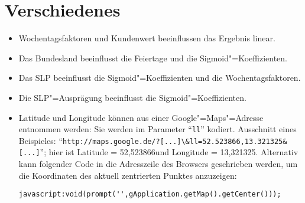 \chapter{Verschiedenes}\label{chap:remarks}

\begin{itemize}
\item Wochentagsfaktoren und Kundenwert beeinflussen das Ergebnis linear.
\item Das Bundesland beeinflusst die Feiertage und die Sigmoid"=Koeffizienten.
\item Das SLP beeinflusst die Sigmoid"=Koeffizienten und die Wochentagsfaktoren.
\item Die SLP"=Ausprägung beeinflusst die Sigmoid"=Koeffizienten.
\item Latitude und Longitude können aus einer Google"=Maps"=Adresse entnommen werden: Sie werden im Parameter "`\verb|ll|"' kodiert. Ausschnitt eines Beispieles: "`\verb|http://maps.google.de/?[...]\&ll=52.523866,13.321325&[...]|"'; hier ist Latitude = 52,523866\degree und Longitude = 13,321325\degree . Alternativ kann folgender Code in die Adresszeile des Browsers geschrieben werden, um die Koordinaten des aktuell zentrierten Punktes anzuzeigen:
\begin{verbatim}
javascript:void(prompt('',gApplication.getMap().getCenter()));
\end{verbatim}

\end{itemize}
